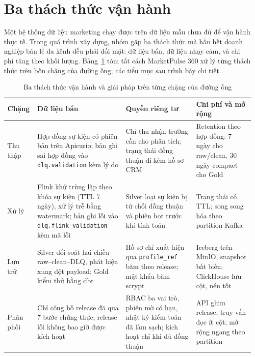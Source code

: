 
\section{Ba thách thức vận hành}
\label{sec:c6-thach-thuc}
Một hệ thống dữ liệu marketing chạy được trên dữ liệu mẫu chưa đủ để vận hành thực tế. Trong quá trình xây dựng, nhóm gặp ba thách thức mà hầu hết doanh nghiệp bán lẻ đa kênh đều phải đối mặt: dữ liệu bẩn, dữ liệu nhạy cảm, và chi phí tăng theo khối lượng. Bảng~\ref{tab:challenges} tóm tắt cách MarketPulse 360 xử lý từng thách thức trên bốn chặng của đường ống; các tiểu mục sau trình bày chi tiết.

\begin{table}[H]
\centering
\caption{Ba thách thức vận hành và giải pháp trên từng chặng của đường ống}
\label{tab:challenges}
\footnotesize
\renewcommand{\arraystretch}{1.25}
\begin{tabularx}{\textwidth}{>{\raggedright\arraybackslash}p{1.9cm} >{\raggedright\arraybackslash}X >{\raggedright\arraybackslash}X >{\raggedright\arraybackslash}X}
\toprule
\textbf{Chặng} & \textbf{Dữ liệu bẩn} & \textbf{Quyền riêng tư} & \textbf{Chi phí và mở rộng} \\
\midrule
Thu thập & Hợp đồng sự kiện có phiên bản trên Apicurio; bản ghi sai hợp đồng vào \texttt{dlq.validation} kèm lý do & Chỉ thu nhận trường cần cho phân tích; trạng thái đồng thuận đi kèm hồ sơ CRM & Retention theo hợp đồng: 7 ngày cho raw/clean, 30 ngày compact cho Gold \\
Xử lý & Flink khử trùng lặp theo khóa sự kiện (TTL 7 ngày), xử lý trễ bằng watermark; bản ghi lỗi vào \texttt{dlq.flink-validation} kèm mã lỗi & Silver loại sự kiện bị từ chối đồng thuận và phiên bot trước khi tính toán & Trạng thái có TTL; song song hóa theo partition Kafka \\
Lưu trữ & Silver đối soát hai chiều raw--clean--DLQ, phát hiện xung đột payload; Gold kiểm thử bằng dbt & Hồ sơ chỉ xuất hiện qua \texttt{profile\_ref} băm theo release; mật khẩu băm scrypt & Iceberg trên MinIO, snapshot bất biến; ClickHouse lưu cột, nén tốt \\
Phân phối & Chỉ công bố release đã qua 7 bước chứng thực; release lỗi không bao giờ được kích hoạt & RBAC ba vai trò, phiên mờ có hạn, nhật ký kiểm toán đã làm sạch; kích hoạt chỉ khi đủ đồng thuận & API ghim release, truy vấn đọc ít cột; mở rộng ngang theo partition \\
\bottomrule
\end{tabularx}
\end{table}

